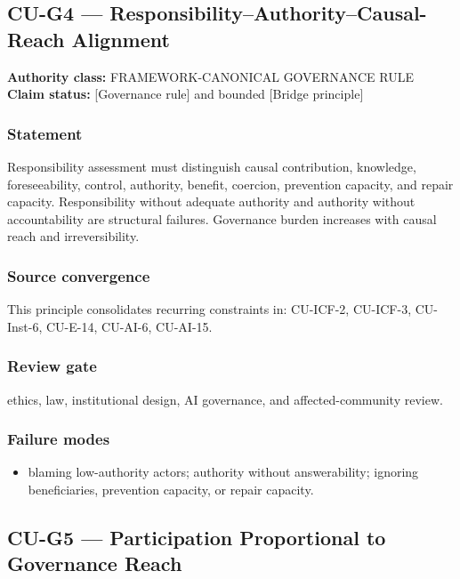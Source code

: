 \documentclass[
  11pt,
]{article}
\providecommand{\tightlist}{%
  \setlength{\itemsep}{0pt}\setlength{\parskip}{0pt}}
\begin{document}
\subsection{CU-G4 --- Responsibility--Authority--Causal-Reach
Alignment}\label{cu-g4-responsibilityauthoritycausal-reach-alignment}

\textbf{Authority class:} FRAMEWORK-CANONICAL GOVERNANCE RULE\\
\textbf{Claim status:} {[}Governance rule{]} and bounded {[}Bridge
principle{]}

\subsubsection{Statement}\label{statement-54}

Responsibility assessment must distinguish causal contribution,
knowledge, foreseeability, control, authority, benefit, coercion,
prevention capacity, and repair capacity. Responsibility without
adequate authority and authority without accountability are structural
failures. Governance burden increases with causal reach and
irreversibility.

\subsubsection{Source convergence}\label{source-convergence-3}

This principle consolidates recurring constraints in: CU-ICF-2,
CU-ICF-3, CU-Inst-6, CU-E-14, CU-AI-6, CU-AI-15.

\subsubsection{Review gate}\label{review-gate-10}

ethics, law, institutional design, AI governance, and affected-community
review.

\subsubsection{Failure modes}\label{failure-modes-27}

\begin{itemize}
\tightlist
\item
  blaming low-authority actors; authority without answerability;
  ignoring beneficiaries, prevention capacity, or repair capacity.
\end{itemize}

\subsection{CU-G5 --- Participation Proportional to Governance
Reach}\label{cu-g5-participation-proportional-to-governance-reach}
\end{document}
